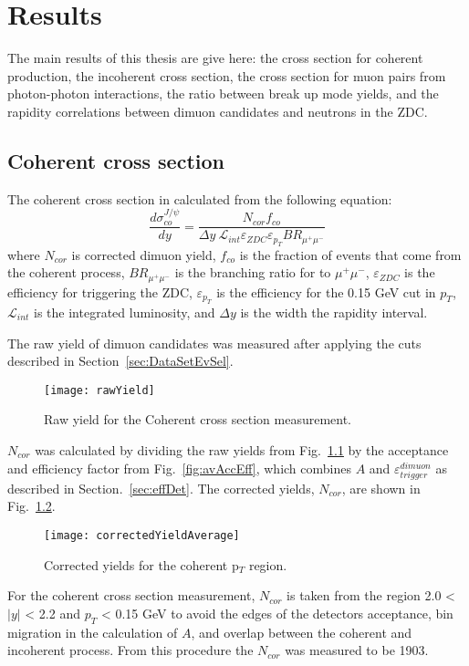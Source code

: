 
\chapter{Results} 
  The main results of this thesis are give here:
    the cross section for coherent \JPsi production, the incoherent \JPsi cross
    section, the cross section for muon pairs from photon-photon interactions,
    the ratio between break up mode yields, and the rapidity correlations 
    between dimuon candidates and neutrons in the ZDC.

  \section{Coherent cross section}
  The coherent cross section in calculated from the following equation:
  \begin{equation}
    \frac{d\sigma^{J/\psi}_{co}}{dy}  = \frac{N_{cor} f_{co}  }
    { \Delta y~\mathcal{L}_{int} \varepsilon_{ZDC} \varepsilon_{p_{T}} 
      BR_{\mu^{+}\mu^{-}}}
    \label{eq:expXSecCo}
   \end{equation}
   where $N_{cor}$ is corrected dimuon yield, $f_{co}$ is the 
     fraction of events that come from the coherent process, 
     $BR_{\mu^{+}\mu^{-}}$ is the branching ratio for \JPsi to $\mu^{+}\mu^{-}$, 
     $\varepsilon_{ZDC}$ is the efficiency for triggering the ZDC, 
     $\varepsilon_{p_{T}}$ is the efficiency for the 0.15 GeV cut in $p_{T}$, 
     $\mathcal{L}_{int}$ is the integrated luminosity, and $\Delta y$ is the 
     width the rapidity interval.

  The raw yield of dimuon candidates was measured after applying the cuts 
    described in Section~\ref{sec:DataSetEvSel}.
  \begin{figure}[!Hhtb]
    \centering
    \texttt{[image: rawYield]}
    \caption{Raw yield for the Coherent cross section measurement.}
    \label{fig:rawYieldCo}
  \end{figure}
  $N_{cor}$ was calculated by dividing the raw yields from 
    Fig.~\ref{fig:rawYieldCo} by the acceptance and efficiency factor from 
    Fig.~\ref{fig:avAccEff}, which combines $A$ and 
    $\varepsilon^{dimuon}_{trigger}$ as described in Section.~\ref{sec:effDet}.
  The corrected yields, $N_{cor}$, are shown in Fig.~\ref{fig:corYieldCo}.
  \begin{figure}[!Hhtb]
    \centering
    \texttt{[image: correctedYieldAverage]}
    \caption{Corrected yields for the coherent p$_{T}$ region.}
    \label{fig:corYieldCo}
  \end{figure}
  For the coherent cross section measurement, $N_{cor}$ is taken from the 
    region 2.0 < $|y|$ < 2.2 and $p_{T}$ < 0.15 GeV to avoid the edges of the
    detectors acceptance, bin migration in the calculation of $A$, and overlap
    between the coherent and incoherent process.
  From this procedure the $N_{cor}$ was measured to be 1903.
  
